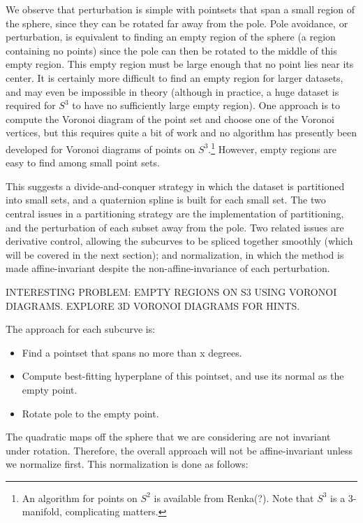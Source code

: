 \documentclass[12pt]{article}
\begin{document}
We observe that perturbation is simple with pointsets that span a small
region of the sphere, since they can be rotated far away from the pole.
Pole avoidance, or perturbation, 
is equivalent to finding an empty region of the sphere (a region containing
no points) since the pole can then be rotated to the middle of this empty region.
This empty region must be large enough that no point lies near its center.
It is certainly more difficult to find an empty region for larger datasets, and
may even be impossible in theory (although in practice, a huge dataset is required
for $S^3$ to have no sufficiently large empty region).
One approach is to compute the Voronoi diagram of the point set and choose
one of the Voronoi vertices, but this requires quite a bit of work
and no algorithm has presently been developed for Voronoi diagrams 
of points on $S^3$.\footnote{An algorithm for points on $S^2$ is available from 
  Renka(?).  Note that $S^3$ is a 3-manifold, complicating matters.}
However, empty regions are easy to find among small point sets.

This suggests a divide-and-conquer strategy in which the dataset is partitioned
into small sets, and a quaternion spline is built for each small set.
The two central issues in a partitioning strategy are
the implementation of partitioning, and the perturbation of each subset
away from the pole.
Two related issues are derivative control, allowing the subcurves to be spliced 
together smoothly (which will be covered in the next section);
and normalization, in which the method is made affine-invariant despite the
non-affine-invariance of each perturbation.

INTERESTING PROBLEM: EMPTY REGIONS ON S3 USING VORONOI DIAGRAMS.
EXPLORE 3D VORONOI DIAGRAMS FOR HINTS.

The approach for each subcurve is:
\begin{itemize}
\item Find a pointset that spans no more than x degrees.
\item Compute best-fitting hyperplane of this pointset, and use its normal as the 
      empty point.
\item Rotate pole to the empty point.
\end{itemize}

The quadratic maps off the sphere that we are considering are not invariant
under rotation.
Therefore, the overall approach will not be affine-invariant unless we normalize first.
This normalization is done as follows:
\end{document}
